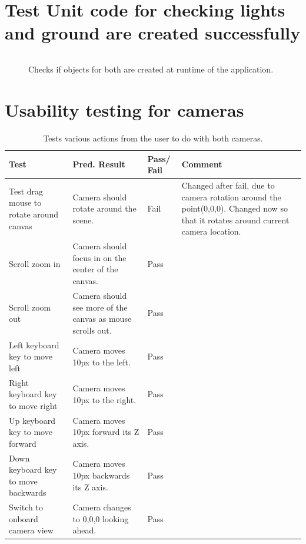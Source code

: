 \section{Test Unit code for checking lights and ground are created successfully}
\label{test:lights}
\begin{figure}[h!]
\caption{Checks if objects for both are created at runtime of the application.}
\begin{lstlisting}
\end{lstlisting}
\end{figure}

\section{Usability testing for cameras}
\label{test:cameras}
\begin{table}[h]
\begin{tabular}{|p{4.5cm}|p{4.5cm}|p{1cm}|p{4cm}|}
\hline
\textbf{Test} & \textbf{Pred. Result} & \textbf{Pass/ Fail} & \textbf{Comment}                        \\ \hline
Test drag mouse to rotate around canvas    &  Camera should rotate around the scene.  &     Fail       &  Changed after fail, due to camera rotation around the point(0,0,0). Changed now so that it rotates around current camera location.    \\ \hline
Scroll zoom in    &   Camera should focus in on the center of the canvas. &   Pass         &    \\ \hline
Scroll zoom out    &   Camera should see more of the canvas as mouse scrolls out. & Pass           &     \\ \hline
Left keyboard key to move left    &  Camera moves 10px to the left.  &   Pass         &     \\ \hline
Right keyboard key to move right    & Camera moves 10px to the right.   &    Pass        &     \\ \hline
Up keyboard key to move forward    &  Camera moves 10px forward its Z axis.  &   Pass         &     \\ \hline
Down keyboard key to move backwards    &  Camera moves 10px backwards its Z axis.  &  Pass          &     \\ \hline
Switch to onboard camera view   &  Camera changes to 0,0,0 looking ahead. &  Pass          &     \\ \hline
\end{tabular}
\caption{Tests various actions from the user to do with both cameras.}
\end{table}

